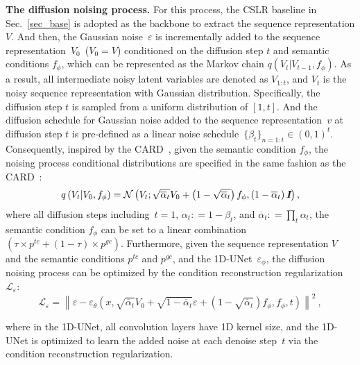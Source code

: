 \documentclass[sigconf]{acmart}
\begin{document}
\noindent\textbf{The diffusion noising process.}
For this process, the CSLR baseline in Sec.~\ref{sec_base} is adopted as the backbone to extract the sequence representation $V$. 
And then, the Gaussian noise~$\varepsilon$ is incrementally added to the sequence representation~$V_0$~($V_0=V$) conditioned on the diffusion step $t$ and semantic conditions $f_\phi$, which can be represented
as the Markov chain $q({V_t}|{V_{t - 1}, f_\phi})$.
As a result, all intermediate noisy latent variables are denoted as $V_{1:t}$, and ${V_t}$ is the noisy sequence representation with Gaussian distribution.
Specifically, the diffusion step $t$ is sampled from a uniform distribution of $[1, t]$.
And the diffusion schedule for Gaussian noise added to the sequence representation~$v$ at diffusion step $t$ is pre-defined as a linear noise schedule~${\{ {\beta _t}\} _{n = 1:t}} \in {(0,1)^t}$.
Consequently, inspired by the CARD~\cite{han2022card}, given the semantic condition $f_{\phi}$, the noising process conditional distributions are specified in the same fashion as the CARD~\cite{han2022card}:
\begin{equation}
    q\left( {{V_t}|{V_0},{f_\phi }} \right) = {\mathcal{N} }\left( {{V_t};\sqrt {{{\overline \alpha  }_t}} {V_0} + \left( {1 - \sqrt {{{\overline \alpha  }_t}} } \right){f_\phi },\left( {1 - {{\overline \alpha  }_t}} \right) \textit{\textbf{I}}} \right),
    \label{Eq:yt}
\end{equation}
\noindent where all diffusion steps including~$t=1$, ${\alpha _t}: = 1 - {\beta _t}$, and ${\overline \alpha  _t}: = \prod\nolimits_t {{\alpha _t}} $, the semantic condition $f_{\phi}$ can be set to a linear combination~$(\tau  \times p^{tc}+(1-\tau) \times p^{gc})$. 
Furthermore, given the sequence representation $V$ and the semantic conditions $p^{tc}$ and $p^{gc}$, and the 1D-UNet~$\varepsilon_\phi$, the diffusion noising process can be optimized by the condition reconstruction regularization~$\mathcal{L}_{\varepsilon}$:
\begin{equation}
    {\mathcal{L}_\varepsilon } = {\left\| {\varepsilon  - {\varepsilon _\theta }\left( {x,\sqrt {{{\overline \alpha  }_t}} {V_0} + \sqrt {1 - {{\overline \alpha  }_t}} \varepsilon  + \left( {1 - \sqrt {{{\overline \alpha  }_t}} } \right){f_\phi },{f_\phi },t} \right)} \right\|^2}\ ,
    \label{Eq:crr}
\end{equation}

\noindent where in the 1D-UNet, all convolution layers have 1D kernel size, and the 1D-UNet is optimized to learn the added noise at each denoise step~$t$ via the condition reconstruction regularization.
\end{document}
